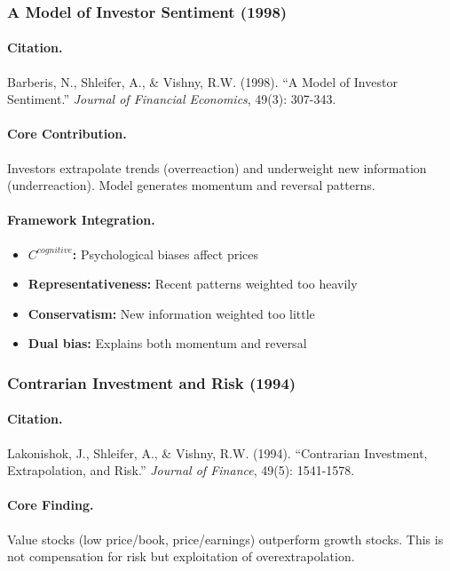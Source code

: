 \subsubsection{A Model of Investor Sentiment (1998)}

\paragraph{Citation.}
Barberis, N., Shleifer, A., \& Vishny, R.W. (1998).
``A Model of Investor Sentiment.''
\emph{Journal of Financial Economics}, 49(3): 307-343.

\paragraph{Core Contribution.}
Investors extrapolate trends (overreaction) and underweight new information
(underreaction). Model generates momentum and reversal patterns.

\paragraph{Framework Integration.}
\begin{itemize}
  \item \textbf{$C^{cognitive}$:} Psychological biases affect prices
  \item \textbf{Representativeness:} Recent patterns weighted too heavily
  \item \textbf{Conservatism:} New information weighted too little
  \item \textbf{Dual bias:} Explains both momentum and reversal
\end{itemize}

\subsubsection{Contrarian Investment and Risk (1994)}

\paragraph{Citation.}
Lakonishok, J., Shleifer, A., \& Vishny, R.W. (1994).
``Contrarian Investment, Extrapolation, and Risk.''
\emph{Journal of Finance}, 49(5): 1541-1578.

\paragraph{Core Finding.}
Value stocks (low price/book, price/earnings) outperform growth stocks.
This is not compensation for risk but exploitation of overextrapolation.

